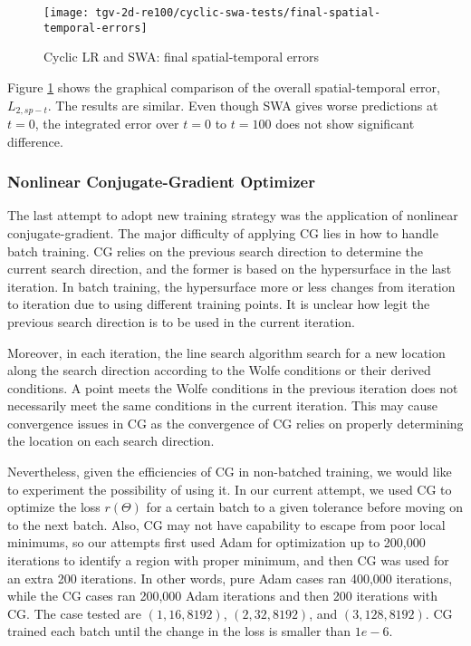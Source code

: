\begin{figure}[hbt!]
    \centering%
    \texttt{[image: tgv-2d-re100/cyclic-swa-tests/final-spatial-temporal-errors]}%
    \caption[%
        Cyclic LR and SWA: final spatial-temporal errors%
    ]{%
        Cyclic LR and SWA: final spatial-temporal errors%
    }\label{fig:cyclic-swa-tests-final-sterrs}%
\end{figure}

Figure \ref{fig:cyclic-swa-tests-final-sterrs} shows the graphical comparison of the overall spatial-temporal error, $L_{2,sp-t}$.
The results are similar.
Even though SWA gives worse predictions at $t=0$, the integrated error over $t=0$ to $t=100$ does not show significant difference.

\subsubsection{Nonlinear Conjugate-Gradient Optimizer}
\label{sec:ncg-tests}

The last attempt to adopt new training strategy was the application of nonlinear conjugate-gradient.
The major difficulty of applying CG lies in how to handle batch training.
CG relies on the previous search direction to determine the current search direction, and the former is based on the hypersurface in the last iteration.
In batch training, the hypersurface more or less changes from iteration to iteration due to using different training points.
It is unclear how legit the previous search direction is to be used in the current iteration.

Moreover, in each iteration, the line search algorithm search for a new location along the search direction according to the Wolfe conditions or their derived conditions.
A point meets the Wolfe conditions in the previous iteration does not necessarily meet the same conditions in the current iteration.
This may cause convergence issues in CG as the convergence of CG relies on properly determining the location on each search direction.

Nevertheless, given the efficiencies of CG in non-batched training, we would like to experiment the possibility of using it.
In our current attempt, we used CG to optimize the loss $r(\Theta)$ for a certain batch to a given tolerance before moving on to the next batch.
Also, CG may not have capability to escape from poor local minimums, so our attempts first used Adam for optimization up to 200,000 iterations to identify a region with proper minimum, and then CG was used for an extra 200 iterations.
In other words, pure Adam cases ran 400,000 iterations, while the CG cases ran 200,000 Adam iterations and then 200 iterations with CG.
The case tested are $(1, 16, 8192)$, $(2, 32, 8192)$, and $(3, 128, 8192)$.
CG trained each batch until the change in the loss is smaller than $1e-6$.


